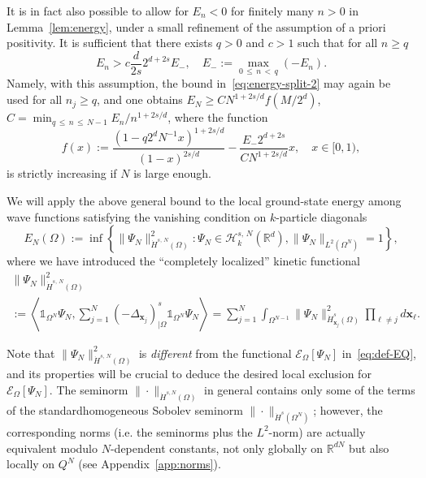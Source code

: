 \documentclass[AHL, Unicode, longabstracts, published]{cedram}
\newcommand*\R {\mathbb{R}}
\newcommand\1{{\ensuremath {\mathds 1} }}
\newcommand{\bx}{\mathbf{x}}
\newcommand{\cH}{\mathcal{H}}
\newcommand{\cE}{\mathcal{E}}
\begin{document}
\begin{rema}
It is in fact also possible to allow for $E_n < 0$ for finitely many $n>0$ in Lemma~\ref{lem:energy}, under a small refinement of the assumption of a priori positivity. It is sufficient that there exists $q > 0$ and $c > 1$ such that for all $n \ge q$
\begin{equation}\label{eq:energy-positivity-refined}
E_n > c \frac{d}{2s} 2^{d+2s} E_-,
\quad E_- := \max_{0\,\le\,n\,<\,q} (-E_n).
\end{equation}
Namely, with this assumption, the bound in~\eqref{eq:energy-split-2} may again be used for all $n_j \ge q$, and one obtains $E_N \ge C N^{1+2s/d} f(M/2^d)$, $C = \min_{q\,\le\,n\,\le\,N-1} E_n/n^{1+2s/d}$, where the function
\[
f(x) := \frac{(1-q2^d N^{-1} x)^{1+2s/d}}{(1-x)^{2s/d}} - \frac{E_- 2^{d+2s}}{C N^{1+2s/d}} x,
\quad x \in [0,1),
\]
is strictly increasing if $N$ is large enough.
\end{rema}

We will apply the above general bound to the local ground-state energy among wave functions satisfying the vanishing condition on $k$-particle diagonals
\begin{equation}\label{eq:def-EnQ}
E_N(\Omega) := \inf \left\{ \|\Psi_N\|_{\dot H^{s,\,N}(\Omega)}^2 : \Psi_N \in \cH^{s,\,N}_k(\R^d), \| \Psi_N\|_{L^2\left(\Omega^N\right)}=1 \right\},
\end{equation}
where we have introduced the ``completely localized'' kinetic functional
\begin{multline}\label{eq:def-local-kinetic}
\|\Psi_N\|_{\dot H^{s,\,N}(\Omega)}^2\\
:= \left\langle \1_{\Omega^N} \Psi_N, \sum_{j=1}^N (-\Delta_{\bx_j})^s_{|\Omega} \1_{\Omega^N} \Psi_N \right\rangle= \sum_{j=1}^N \int_{\Omega^{N-1}} \|\Psi_N\|_{\dot H^{s}_{\bx_j}(\Omega)}^2 \prod_{\ell \ne j} d \bx_\ell.
\end{multline}

Note that $\|\Psi_N\|_{\dot H^{s,\,N}(\Omega)}^2$ is \emph{different} from the functional $\cE_{\Omega}[\Psi_N]$ in~\eqref{eq:def-EQ}, and its properties will be crucial to deduce the desired local exclusion for $\cE_{\Omega}[\Psi_N]$. The seminorm $\|\cdot\|_{\dot H^{s,N}(\Omega)}$ in general contains only some of the terms of the standard\linebreak homogeneous Sobolev seminorm $\|\cdot\|_{\dot H^{s}(\Omega^N)}$; however, the corresponding norms (i.e. the seminorms plus the $L^2$-norm) are actually equivalent modulo $N$-dependent constants, not only globally on $\R^{dN}$ but also locally on $Q^N$ (see Appendix~\ref{app:norms}).
\end{document}
